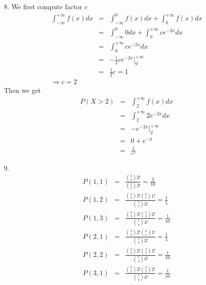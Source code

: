 \documentclass[12pt]{article}
\begin{document}
8. We first compute factor $c$
\begin{eqnarray*}
  \int_{-\infty}^{+\infty} f(x) dx
  &=& \int_{-\infty}^{0} f(x) dx + \int_{0}^{+\infty} f(x) dx \\
  &=& \int_{-\infty}^{0} 0 dx + \int_{0}^{+\infty} c e^{-2x} dx \\
  &=& \int_{0}^{+\infty} c e^{-2x} dx \\
  &=& - \frac {1}{2} c e^{-2x}|_0^{+\infty} \\
  &=& \frac {1}{2} c = 1 \\
  \Longrightarrow c = 2
\end{eqnarray*}
Then we get
\begin{eqnarray*}
  P(X > 2)
  &=& \int_{2}^{+\infty} f(x) dx \\
  &=& \int_{2}^{+\infty} 2 e^{-2x} dx \\
  &=& -e^{-2x}|_{2}^{+\infty} \\
  &=& 0 + e^{-4} \\
  &=& \frac {1}{e^4}
\end{eqnarray*}

9.
\begin{eqnarray*}
  P(1,1)
  &=& \frac {{3 \choose 2}2!}{{5 \choose 2}2!}
  = \frac {3}{10} \\
  P(1,2)
  &=& \frac {{3 \choose 2} 2! {2 \choose 1} 1!} {{5 \choose 3} 3!}
  = \frac {1}{5} \\
  P(1,3)
  &=& \frac {{3 \choose 2} 2! {2 \choose 2} 2!} {{5 \choose 4} 4!}
  = \frac {1}{10} \\
  P(2,1)
  &=& \frac {{3 \choose 2} 2! {2 \choose 1} 1!} {{5 \choose 3} 3!}
  = \frac {1}{5} \\
  P(2,2)
  &=& \frac {{3 \choose 2} 2! {2 \choose 2} 2!} {{5 \choose 4} 4!}
  = \frac {1}{10} \\
  P(3,1)
  &=& \frac {{3 \choose 2} 2! {2 \choose 2} 2!} {{5 \choose 4} 4!}
  = \frac {1}{10}
\end{eqnarray*}
\end{document}
